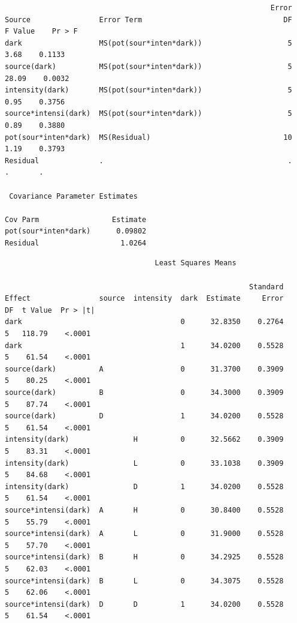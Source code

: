 \begin{small}
\begin{verbatim}
                                                              Error
Source                Error Term                                 DF    F Value    Pr > F
dark                  MS(pot(sour*inten*dark))                    5       3.68    0.1133
source(dark)          MS(pot(sour*inten*dark))                    5      28.09    0.0032
intensity(dark)       MS(pot(sour*inten*dark))                    5       0.95    0.3756
source*intensi(dark)  MS(pot(sour*inten*dark))                    5       0.89    0.3880
pot(sour*inten*dark)  MS(Residual)                               10       1.19    0.3793
Residual              .                                           .        .       .    

 Covariance Parameter Estimates
 
Cov Parm                 Estimate
pot(sour*inten*dark)      0.09802
Residual                   1.0264
\end{verbatim}
\newpage
\begin{verbatim}
                                   Least Squares Means
 
                                                         Standard
Effect                source  intensity  dark  Estimate     Error    DF  t Value  Pr > |t|
dark                                     0      32.8350    0.2764     5   118.79    <.0001
dark                                     1      34.0200    0.5528     5    61.54    <.0001
source(dark)          A                  0      31.3700    0.3909     5    80.25    <.0001
source(dark)          B                  0      34.3000    0.3909     5    87.74    <.0001
source(dark)          D                  1      34.0200    0.5528     5    61.54    <.0001
intensity(dark)               H          0      32.5662    0.3909     5    83.31    <.0001
intensity(dark)               L          0      33.1038    0.3909     5    84.68    <.0001
intensity(dark)               D          1      34.0200    0.5528     5    61.54    <.0001
source*intensi(dark)  A       H          0      30.8400    0.5528     5    55.79    <.0001
source*intensi(dark)  A       L          0      31.9000    0.5528     5    57.70    <.0001
source*intensi(dark)  B       H          0      34.2925    0.5528     5    62.03    <.0001
source*intensi(dark)  B       L          0      34.3075    0.5528     5    62.06    <.0001
source*intensi(dark)  D       D          1      34.0200    0.5528     5    61.54    <.0001
\end{verbatim}
\end{small}
